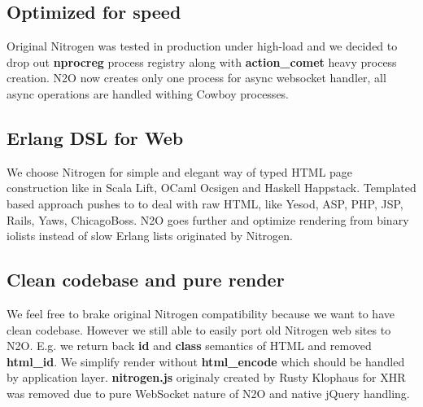 \documentclass[11pt]{article}
\begin{document}
\subsection*{Optimized for speed}
Original Nitrogen was tested in production under high-load and we decided to drop out
{\bf nprocreg} process registry along with {\bf{action\_comet}} heavy process creation. N2O now creates
only one process for async websocket handler, all async operations are handled withing
Cowboy processes.

\subsection*{Erlang DSL for Web}
We choose Nitrogen for simple and elegant way of typed HTML page construction like 
in Scala Lift, OCaml Ocsigen and Haskell Happstack.
Templated based approach pushes to to deal with raw HTML, like 
Yesod, ASP, PHP, JSP, Rails, Yaws, ChicagoBoss.
N2O goes further and optimize rendering from binary iolists instead of slow Erlang
lists originated by Nitrogen.


\subsection*{Clean codebase and pure render}
We feel free to brake original Nitrogen compatibility because we want to have clean codebase.
However we still able to easily port old Nitrogen web sites to N2O. 
E.g. we return back {\bf id} and {\bf class} semantics of HTML and removed {\bf html\_id}.
We simplify render without {\bf html\_encode} which should be handled by application layer.
{\bf nitrogen.js} originaly created by Rusty Klophaus for XHR was removed due to pure
WebSocket nature of N2O and native jQuery handling.








\end{document}
